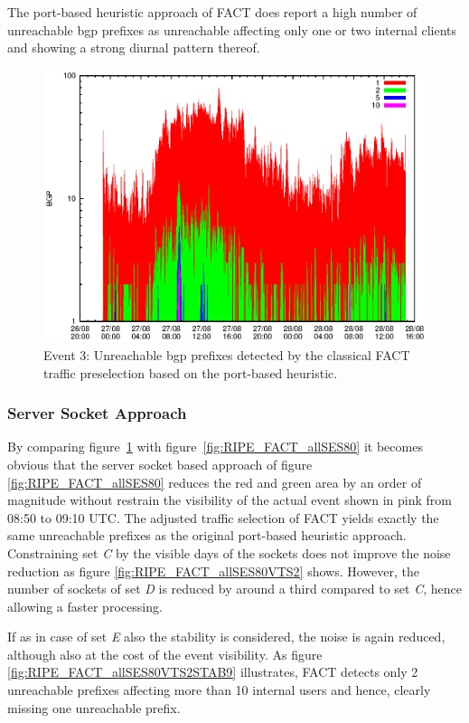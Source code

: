 The port-based heuristic approach of \gls{FACT} does report a high number of unreachable \gls{bgp} prefixes as unreachable affecting only one or two internal clients and showing a strong diurnal pattern thereof. 
\begin{figure}
	[p] \centering 
	\includegraphics[width=0.75\linewidth]{images/events/2010_08_27/bgp_log_port80_ref.eps} \caption{Event 3: Unreachable \gls{bgp} prefixes detected by the classical \gls{FACT} traffic preselection based on the port-based heuristic.} 
	\label{fig:RIPE_FACT_REF} 
\end{figure}

\subsubsection{Server Socket Approach} 

By comparing figure \ref{fig:RIPE_FACT_REF} with figure \ref{fig:RIPE_FACT_allSES80} it becomes obvious that the \gls{server socket} based approach of figure \ref{fig:RIPE_FACT_allSES80} reduces the red and green area by an order of magnitude without restrain the visibility of the actual event shown in pink from 08:50 to 09:10 UTC. 
The adjusted traffic selection of \gls{FACT} yields exactly the same unreachable prefixes as the original port-based heuristic approach. 
Constraining set \emph{C} by the visible days of the sockets does not improve the noise reduction as figure \ref{fig:RIPE_FACT_allSES80VTS2} shows. 
However, the number of sockets of set \emph{D} is reduced by around a third compared to set \emph{C}, hence allowing a faster processing.

If as in case of set \emph{E} also the stability is considered, the noise is again reduced, although also at the cost of the event visibility. 
As figure \ref{fig:RIPE_FACT_allSES80VTS2STAB9} illustrates, \gls{FACT} detects only 2 unreachable prefixes affecting more than 10 internal users and hence, clearly missing one unreachable prefix. 


